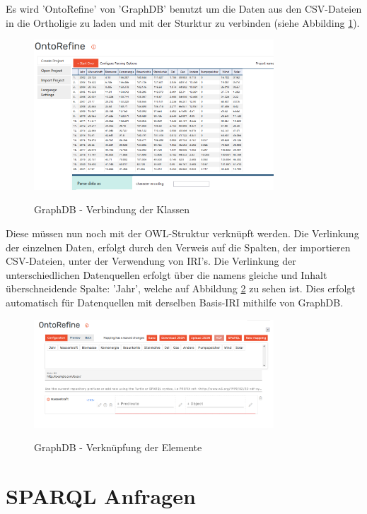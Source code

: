 \documentclass[12pt]{article}
\begin{document}
Es wird 'OntoRefine' von 'GraphDB' benutzt um die Daten aus den CSV-Dateien in die Ortholigie zu laden und mit der Sturktur zu verbinden (siehe Abbilding \ref{fig:graphrefine}).

\newpage

\begin{figure}[!ht]
    \caption{GraphDB - Verbindung der Klassen}
    \centering
    \includegraphics[width=0.8\textwidth]{images/graphdb_2.png}
    \label{fig:graphrefine}
\end{figure}

 Diese müssen nun noch mit der OWL-Struktur verknüpft werden. Die Verlinkung der einzelnen Daten, erfolgt durch den Verweis auf die Spalten, der importieren CSV-Dateien, unter der Verwendung von IRI's. Die Verlinkung der unterschiedlichen Datenquellen erfolgt über die namens gleiche und Inhalt überschneidende Spalte: 'Jahr', welche auf Abbildung \ref{fig:graphrefine-2} zu sehen ist. Dies erfolgt automatisch für Datenquellen mit derselben Basis-IRI mithilfe von GraphDB.

\begin{figure}[!ht]
    \caption{GraphDB - Verknüpfung der Elemente}
    \centering
    \includegraphics[width=0.8\textwidth]{images/graphdb_3.png}
    \label{fig:graphrefine-2}
\end{figure}

\newpage

    \section{SPARQL Anfragen}
    
\end{document}
